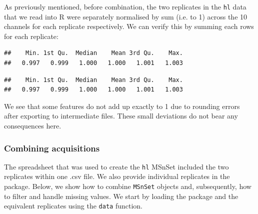As previously mentioned, before combination, the two replicates in the
\texttt{hl} data that we read into R were separately normalised by sum (i.e.
to 1) across the 10 channels for each replicate respectively. We can
verify this by summing each rows for each replicate:

\begin{knitrout}
\color{fgcolor}\begin{kframe}
\begin{alltt}
\hlstd{(}\hlstd{(}\hlstd{(hl[, hl}\hlopt{$} \hlopt{==} \hlstd{])))}
\end{alltt}
\begin{verbatim}
##    Min. 1st Qu.  Median    Mean 3rd Qu.    Max. 
##   0.997   0.999   1.000   1.000   1.001   1.003
\end{verbatim}
\begin{alltt}
\hlstd{(}\hlstd{(}\hlstd{(hl[, hl}\hlopt{$} \hlopt{==} \hlstd{])))}
\end{alltt}
\begin{verbatim}
##    Min. 1st Qu.  Median    Mean 3rd Qu.    Max. 
##   0.997   0.999   1.000   1.000   1.001   1.003
\end{verbatim}
\end{kframe}
\end{knitrout}

We see that some features do not add up exactly to 1 due to rounding
errors after exporting to intermediate files. These small deviations
do not bear any consequences here.


\subsubsection*{Combining acquisitions}

The spreadsheet that was used to create the \texttt{hl} MSnSet
included the two replicates within one .csv file.  We also provide
individual replicates in the 
package. Below, we show how to combine \texttt{MSnSet} objects and,
subsequently, how to filter and handle missing values. We start by
loading the  package and the
equivalent replicates using the \texttt{data} function.

\begin{knitrout}
\color{fgcolor}\begin{kframe}
\begin{alltt}
\hlstd{(}\hlstd{)}
\end{alltt}
\end{kframe}
\end{knitrout}

